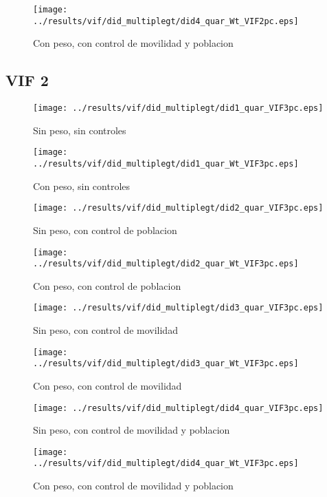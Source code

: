 \documentclass[11pt,letterpaper]{article}
\begin{document}
\begin{figure}[H]
\caption{Con peso, con control de movilidad y poblacion}
\centering
\texttt{[image: ../results/vif/did\_multiplegt/did4\_quar\_Wt\_VIF2pc.eps]}
\end{figure}

\subsection{VIF 2}
\begin{figure}[H]
\caption{Sin peso, sin controles}
\centering
\texttt{[image: ../results/vif/did\_multiplegt/did1\_quar\_VIF3pc.eps]}
\end{figure}

\begin{figure}[H]
\caption{Con peso, sin controles}
\centering
\texttt{[image: ../results/vif/did\_multiplegt/did1\_quar\_Wt\_VIF3pc.eps]}
\end{figure}
\begin{figure}[H]
\caption{Sin peso, con control de poblacion}
\centering
\texttt{[image: ../results/vif/did\_multiplegt/did2\_quar\_VIF3pc.eps]}
\end{figure}

\begin{figure}[H]
\caption{Con peso, con control de poblacion}
\centering
\texttt{[image: ../results/vif/did\_multiplegt/did2\_quar\_Wt\_VIF3pc.eps]}
\end{figure}
\begin{figure}[H]
\caption{Sin peso, con control de movilidad}
\centering
\texttt{[image: ../results/vif/did\_multiplegt/did3\_quar\_VIF3pc.eps]}
\end{figure}

\begin{figure}[H]
\caption{Con peso, con control de movilidad}
\centering
\texttt{[image: ../results/vif/did\_multiplegt/did3\_quar\_Wt\_VIF3pc.eps]}
\end{figure}
\begin{figure}[H]
\caption{Sin peso, con control de movilidad y poblacion}
\centering
\texttt{[image: ../results/vif/did\_multiplegt/did4\_quar\_VIF3pc.eps]}
\end{figure}

\begin{figure}[H]
\caption{Con peso, con control de movilidad y poblacion}
\centering
\texttt{[image: ../results/vif/did\_multiplegt/did4\_quar\_Wt\_VIF3pc.eps]}
\end{figure}
\end{document}
